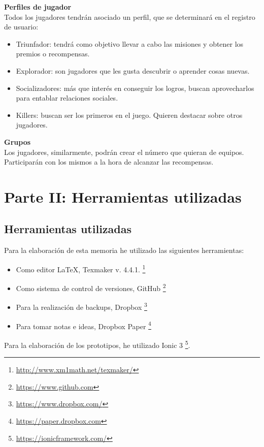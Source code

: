 \documentclass[twoside]{report}
\begin{document}
\textbf{Perfiles de jugador\cite{iebsctj}}\\ 

Todos los jugadores tendrán asociado un perfil, que se determinará en el registro de usuario:
\begin{itemize}

\item Triunfador: tendrá como objetivo llevar a cabo las misiones y obtener los premios o recompensas.
\item Explorador: son jugadores que les gusta descubrir o aprender cosas nuevas.
\item Socializadores: más que interés en conseguir los logros, buscan aprovecharlos para entablar relaciones sociales.
\item Killers: buscan ser los primeros en el juego. Quieren destacar sobre otros jugadores.

\end{itemize}

\textbf{Grupos}\\

Los jugadores, similarmente, podrán crear el número que quieran de equipos. Participarán con los mismos a la hora de alcanzar las recompensas.

\chapter{Parte II: Herramientas utilizadas}
\section{Herramientas utilizadas}

Para la elaboración de esta memoria he utilizado las siguientes herramientas:
\begin{itemize}
\item Como editor \LaTeX , Texmaker v. 4.4.1. \footnote{\url{http://www.xm1math.net/texmaker/}}
\item Como sistema de control de versiones, GitHub \footnote{\url{https://www.github.com}}
\item Para la realización de backups, Dropbox \footnote{\url{https://www.dropbox.com/}}
\item Para tomar notas e ideas, Dropbox Paper \footnote{\url{https://paper.dropbox.com}}
\end{itemize}

Para la elaboración de los prototipos, he utilizado Ionic 3 \footnote{\url{https://ionicframework.com/}}.
\end{document}
